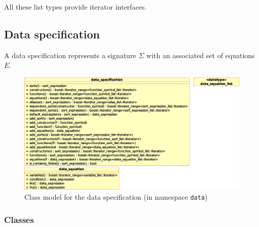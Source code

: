 \documentclass[a4paper,11pt]{article}
\begin{document}
All these list types provide iterator interfaces.

\FloatBarrier
\subsection{Data specification}
A data specification represents a signature $\Sigma$ with an associated set of equations $E$.

\begin{figure}[htp]
    \begin{center}
      \includegraphics[width=\textwidth]{specification}
      \caption{Class model for the data specification (in namespace \texttt{data})}
      \label{fig:class_specification}
    \end{center}
  \end{figure}

\subsubsection{Classes}
\end{document}

